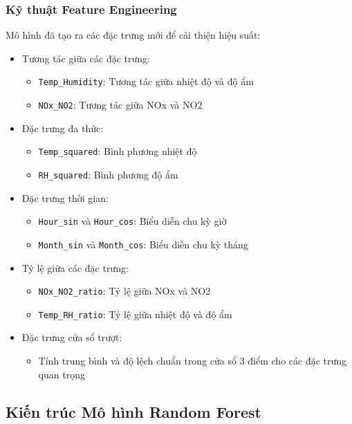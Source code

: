 \subsubsection{Kỹ thuật Feature Engineering}
Mô hình đã tạo ra các đặc trưng mới để cải thiện hiệu suất:
\begin{itemize}
    \item Tương tác giữa các đặc trưng:
    \begin{itemize}
        \item \texttt{Temp\_Humidity}: Tương tác giữa nhiệt độ và độ ẩm
        \item \texttt{NOx\_NO2}: Tương tác giữa NOx và NO2
    \end{itemize}
    \item Đặc trưng đa thức:
    \begin{itemize}
        \item \texttt{Temp\_squared}: Bình phương nhiệt độ
        \item \texttt{RH\_squared}: Bình phương độ ẩm
    \end{itemize}
    \item Đặc trưng thời gian:
    \begin{itemize}
        \item \texttt{Hour\_sin} và \texttt{Hour\_cos}: Biểu diễn chu kỳ giờ
        \item \texttt{Month\_sin} và \texttt{Month\_cos}: Biểu diễn chu kỳ tháng
    \end{itemize}
    \item Tỷ lệ giữa các đặc trưng:
    \begin{itemize}
        \item \texttt{NOx\_NO2\_ratio}: Tỷ lệ giữa NOx và NO2
        \item \texttt{Temp\_RH\_ratio}: Tỷ lệ giữa nhiệt độ và độ ẩm
    \end{itemize}
    \item Đặc trưng cửa sổ trượt:
    \begin{itemize}
        \item Tính trung bình và độ lệch chuẩn trong cửa sổ 3 điểm cho các đặc trưng quan trọng
    \end{itemize}
\end{itemize}

\subsection{Kiến trúc Mô hình Random Forest}

